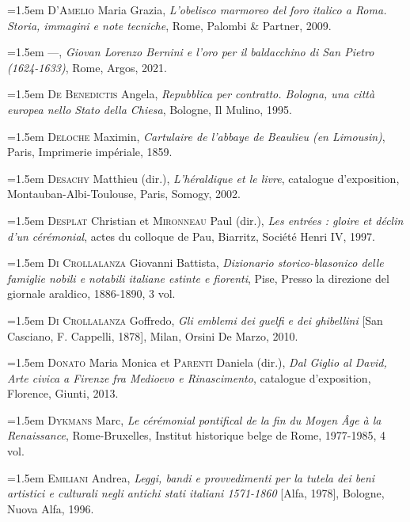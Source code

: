 \documentclass[12pt,twoside,openany]{book}
\newenvironment{PurhBibliography}
  {%
    \par
    \setlength{\parindent}{0pt}%
    \setlength{\leftskip}{0pt}%
  }
  {%
    \par
  }
\begin{document}
\begin{PurhBibliography}
\noindent\hangindent=1.5em \textsc{D’Amelio} Maria Grazia, \textit{L’obelisco marmoreo del foro italico a Roma. Storia, immagini e note tecniche}, Rome, Palombi \& Partner, 2009.\par
\noindent\hangindent=1.5em —, \textit{Giovan Lorenzo Bernini e l’oro per il baldacchino di San Pietro (1624-1633)}, Rome, Argos, 2021.\par
\noindent\hangindent=1.5em \textsc{De Benedictis} Angela, \textit{Repubblica per contratto. Bologna, una città europea nello Stato della Chiesa}, Bologne, Il Mulino, 1995.\par
\noindent\hangindent=1.5em \textsc{Deloche} Maximin, \textit{Cartulaire de l’abbaye de Beaulieu (en Limousin)}, Paris, Imprimerie impériale, 1859.\par
\noindent\hangindent=1.5em \textsc{Desachy} Matthieu (dir.), \textit{L’héraldique et le livre}, catalogue d’exposition, Montauban-Albi-Toulouse, Paris, Somogy, 2002.\par
\noindent\hangindent=1.5em \textsc{Desplat} Christian et \textsc{Mironneau} Paul (dir.), \textit{Les entrées : gloire et déclin d’un cérémonial}, actes du colloque de Pau, Biarritz, Société Henri \textsc{IV}, 1997.\par
\noindent\hangindent=1.5em \textsc{Di Crollalanza} Giovanni Battista, \textit{Dizionario storico-blasonico delle famiglie nobili e notabili italiane estinte e fiorenti}, Pise, Presso la direzione del giornale araldico, 1886-1890, 3 vol.\par
\noindent\hangindent=1.5em \textsc{Di Crollalanza} Goffredo, \textit{Gli emblemi dei guelfi e dei ghibellini} [San Casciano, F. Cappelli, 1878], Milan, Orsini De Marzo, 2010.\par
\noindent\hangindent=1.5em \textsc{Donato} Maria Monica et \textsc{Parenti} Daniela (dir.), \textit{Dal Giglio al David, Arte civica a Firenze fra Medioevo e Rinascimento}, catalogue d’exposition, Florence, Giunti, 2013.\par
\noindent\hangindent=1.5em \textsc{Dykmans} Marc, \textit{Le cérémonial pontifical de la fin du Moyen Âge à la Renaissance}, Rome-Bruxelles, Institut historique belge de Rome, 1977-1985, 4 vol.\par
\noindent\hangindent=1.5em \textsc{Emiliani} Andrea, \textit{Leggi, bandi e provvedimenti per la tutela dei beni artistici e culturali negli antichi stati italiani 1571-1860} [Alfa, 1978], Bologne, Nuova Alfa, 1996.\par

\end{PurhBibliography}
\end{document}
